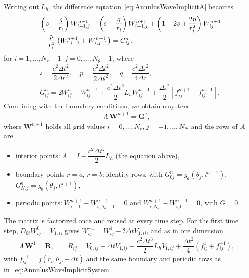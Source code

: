 \documentclass[11pt]{article}
\begin{document}
Writing out $L_h$, the difference equation~\eqref{eq:AnnulusWaveImplicitA} becomes
\begin{align}
&-\left(s-\dfrac{q}{r_i}\right)W_{i-1,j}^{n+1}-\left(s+\dfrac{q}{r_i}\right)W_{i+1,j}^{n+1}+\left(1+2s+\dfrac{2p}{r_i^2}\right)W_{ij}^{n+1} \notag\\
&\quad -\dfrac{p}{r_i^2}\left(W_{i,j-1}^{n+1}+W_{i,j+1}^{n+1}\right)=G_{ij}^n,
\end{align}
for $i=1,\dots,N_r-1$, $j=0,\dots,N_\theta-1$, where
\begin{align*}
&s=\dfrac{c^2\Delta t^2}{2\Delta r^2},\quad p=\dfrac{c^2\Delta t^2}{2\Delta \theta^2},\quad q=\dfrac{c^2\Delta t^2}{4\Delta r},\\
&G_{ij}^n=2W_{ij}^n-W_{ij}^{n-1}+\dfrac{c^2\Delta t^2}{2} L_hW_{ij}^{n-1}+\dfrac{\Delta t^2}{2}\left[f_{ij}^{n+1}+f_{ij}^{n-1}\right].
\end{align*}
Combining with the boundary conditions, we obtain a system
\begin{align}
\label{eq:AnnulusWaveImplicitSystem}
A\,\mathbf{W}^{n+1} = \mathbf{G}^{n},
\end{align}
where $\mathbf{W}^{n+1}$ holds all grid values $i=0,\dots,N_r$, $j=-1,\dots,N_\theta$, and the rows of $A$ are
\begin{itemize}
\item interior points: $A = I - \dfrac{c^2\Delta t^2}{2}L_h$ (the equation above),
\item boundary points $r=a$, $r=b$: identity rows, with $G_{0j}^n=g_a(\theta_j,t^{n+1})$, $G_{N_r j}^n=g_b(\theta_j,t^{n+1})$,
\item periodic points: $W_{i,-1}^{n+1}-W_{i,N_\theta-1}^{n+1}=0$ and $W_{i,N_\theta}^{n+1}-W_{i,0}^{n+1}=0$, with $G=0$.
\end{itemize}
The matrix is factorized once and reused at every time step. For the first time step, $D_{0t}W_{ij}^0=V_{1,ij}$ gives $W_{ij}^{-1}=W_{ij}^1-2\Delta t V_{1,ij}$, and as in one dimension
\begin{align}
A\,\mathbf{W}^{1} = \mathbf{R}, \qquad R_{ij}= V_{0,ij} + \Delta t V_{1,ij} - \dfrac{c^2 \Delta t^3}{2}L_hV_{1,ij} + \dfrac{\Delta t^2}{4}\left(f_{ij}^{1}+f_{ij}^{-1}\right),
\end{align}
with $f_{ij}^{-1}=f(r_i,\theta_j,-\Delta t)$ and the same boundary and periodic rows as in~\eqref{eq:AnnulusWaveImplicitSystem}.
\end{document}
